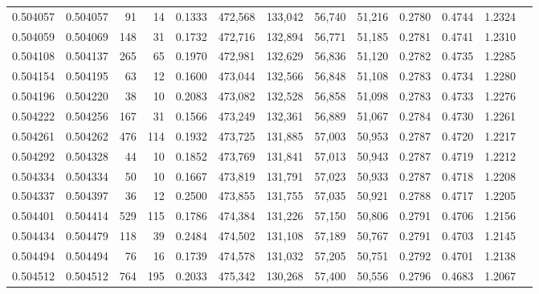 \begin{tabular}{rrrrrrrrrrrrr}
0.504057 & 0.504057 &    91 &    14 &                                     0.1333 & 472,568 & 133,042 &  56,740 &  51,216 & 0.2780 & 0.4744 & 1.2324 \\
0.504059 & 0.504069 &   148 &    31 &                                     0.1732 & 472,716 & 132,894 &  56,771 &  51,185 & 0.2781 & 0.4741 & 1.2310 \\
0.504108 & 0.504137 &   265 &    65 &                                     0.1970 & 472,981 & 132,629 &  56,836 &  51,120 & 0.2782 & 0.4735 & 1.2285 \\
0.504154 & 0.504195 &    63 &    12 &                                     0.1600 & 473,044 & 132,566 &  56,848 &  51,108 & 0.2783 & 0.4734 & 1.2280 \\
0.504196 & 0.504220 &    38 &    10 &                                     0.2083 & 473,082 & 132,528 &  56,858 &  51,098 & 0.2783 & 0.4733 & 1.2276 \\
0.504222 & 0.504256 &   167 &    31 &                                     0.1566 & 473,249 & 132,361 &  56,889 &  51,067 & 0.2784 & 0.4730 & 1.2261 \\
0.504261 & 0.504262 &   476 &   114 &                                     0.1932 & 473,725 & 131,885 &  57,003 &  50,953 & 0.2787 & 0.4720 & 1.2217 \\
0.504292 & 0.504328 &    44 &    10 &                                     0.1852 & 473,769 & 131,841 &  57,013 &  50,943 & 0.2787 & 0.4719 & 1.2212 \\
0.504334 & 0.504334 &    50 &    10 &                                     0.1667 & 473,819 & 131,791 &  57,023 &  50,933 & 0.2787 & 0.4718 & 1.2208 \\
0.504337 & 0.504397 &    36 &    12 &                                     0.2500 & 473,855 & 131,755 &  57,035 &  50,921 & 0.2788 & 0.4717 & 1.2205 \\
0.504401 & 0.504414 &   529 &   115 &                                     0.1786 & 474,384 & 131,226 &  57,150 &  50,806 & 0.2791 & 0.4706 & 1.2156 \\
0.504434 & 0.504479 &   118 &    39 &                                     0.2484 & 474,502 & 131,108 &  57,189 &  50,767 & 0.2791 & 0.4703 & 1.2145 \\
0.504494 & 0.504494 &    76 &    16 &                                     0.1739 & 474,578 & 131,032 &  57,205 &  50,751 & 0.2792 & 0.4701 & 1.2138 \\
0.504512 & 0.504512 &   764 &   195 &                                     0.2033 & 475,342 & 130,268 &  57,400 &  50,556 & 0.2796 & 0.4683 & 1.2067 \\

\end{tabular}

